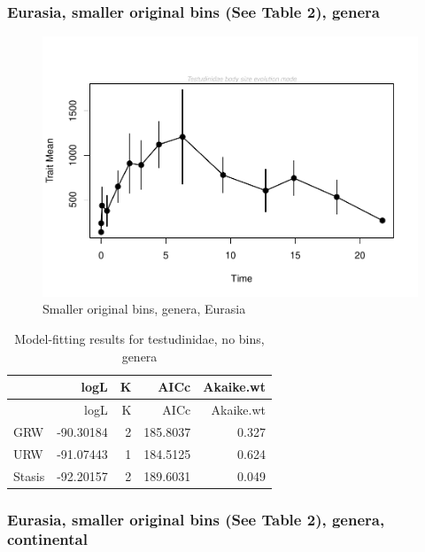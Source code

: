 \documentclass[]{article}
\begin{document}
\newpage 

\subsubsection{Eurasia, smaller original bins (See Table 2),
genera}\label{eurasia-smaller-original-bins-see-table-2-genera}

\begin{figure}[htbp]
\centering
\includegraphics{MA_JJ_files/figure-latex/paleoTS with different time bins, no bins, genera, Eurasia-1.pdf}
\caption{Smaller original bins, genera, Eurasia}
\end{figure}

\begin{longtable}[]{@{}lrrrr@{}}
\caption{Model-fitting results for testudinidae, no bins,
genera}\tabularnewline
\toprule
& logL & K & AICc & Akaike.wt\tabularnewline
\midrule
\endfirsthead
\toprule
& logL & K & AICc & Akaike.wt\tabularnewline
\midrule
\endhead
GRW & -90.30184 & 2 & 185.8037 & 0.327\tabularnewline
URW & -91.07443 & 1 & 184.5125 & 0.624\tabularnewline
Stasis & -92.20157 & 2 & 189.6031 & 0.049\tabularnewline
\bottomrule
\end{longtable}

\newpage 

\subsubsection{Eurasia, smaller original bins (See Table 2), genera,
continental}\label{eurasia-smaller-original-bins-see-table-2-genera-continental}
\end{document}
